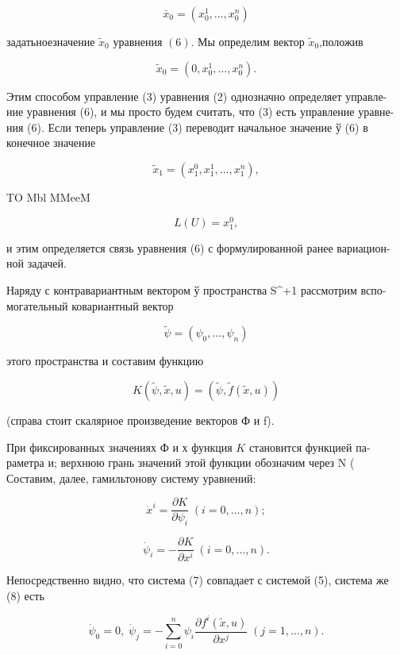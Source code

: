 \documentclass[10pt]{article}
\begin{document}
\[
{\bar{x}}_{0} = \left( {{x}_{0}^{1},\ldots,{x}_{0}^{n}}\right)
\]

задатьноезначение \({\widetilde{x}}_{0}\) уравнения \(\left( 6\right)\). Мы определим вектор \({\widetilde{x}}_{0}\),положив

\[
{\widetilde{x}}_{0} = \left( {0,{x}_{0}^{1},\ldots,{x}_{0}^{n}}\right).
\]

Этим способом управление (3) уравнения (2) однозначно определяет управле- ние уравнения (6), и мы просто будем считать, что (3) есть управление уравне- ния (6). Если теперь управление (3) переводит начальное значение ў (6) в конечное значение

\[
{\widetilde{x}}_{1} = \left( {{x}_{1}^{0},{x}_{1}^{1},\ldots,{x}_{1}^{n}}\right),
\]

TO Mbl MMeeM

\[
L\left( U\right)  = {x}_{1}^{0},
\]

и этим определяется связь уравнения (6) с формулированной ранее вариацион- ной задачей.

Наряду с контравариантным вектором ў пространства S\textasciicircum +1 рассмотрим вспо- могательный ковариантный вектор

\[
\widetilde{\psi } = \left( {{\psi }_{0},\ldots,{\psi }_{n}}\right)
\]

этого пространства и составим функцию

\[
K\left( {\widetilde{\psi },\widetilde{x},u}\right)  = \left( {\widetilde{\psi },\widetilde{f}\left( {\widetilde{x},u}\right) }\right)
\]

(справа стоит скалярное произведение векторов Ф и f).

При фиксированных значениях Ф и х функция \(K\) становится функцией па- раметра и; верхнюю грань значений этой функции обозначим через N ( Составим, далее, гамильтонову систему уравнений:

\[
{\dot{x}}^{i} = \frac{\partial K}{\partial {\psi }_{i}}\;\left( {i = 0,\ldots,n}\right) ; \tag{7}
\]

\[
{\dot{\psi }}_{i} =  - \frac{\partial K}{\partial {x}^{i}}\;\left( {i = 0,\ldots,n}\right). \tag{8}
\]

Непосредственно видно, что система (7) совпадает с системой (5), система же (8) есть

\[
{\dot{\psi }}_{0} = 0,\;{\dot{\psi }}_{j} =  - \mathop{\sum }\limits_{{i = 0}}^{n}{\psi }_{i}\frac{\partial {f}^{i}\left( {\widetilde{x},u}\right) }{\partial {x}^{j}}\;\left( {j = 1,\ldots,n}\right). \tag{9}
\]
\end{document}
